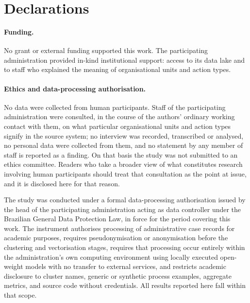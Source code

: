\section*{Declarations}

\paragraph{Funding.}
No grant or external funding supported this work. The participating administration provided
in-kind institutional support: access to its data lake and to staff who explained the meaning of
organisational units and action types.

\paragraph{Ethics and data-processing authorisation.}
No data were collected from human participants. Staff of the participating administration were
consulted, in the course of the authors' ordinary working contact with them, on what particular
organisational units and action types signify in the source system; no interview was recorded,
transcribed or analysed, no personal data were collected from them, and no statement by any
member of staff is reported as a finding. On that basis the study was not submitted to an ethics
committee. Readers who take a broader view of what constitutes research involving human
participants should treat that consultation as the point at issue, and it is disclosed here for
that reason.

The study was conducted under a formal data-processing authorisation issued by the head of the
participating administration acting as data controller under the Brazilian General Data
Protection Law, in force for the period covering this work. The instrument authorises processing of
administrative case records for academic purposes, requires pseudonymisation or anonymisation
before the clustering and vectorisation stages, requires that processing occur entirely within
the administration's own computing environment using locally executed open-weight models with
no transfer to external services, and restricts academic disclosure to cluster names, generic or
synthetic process examples, aggregate metrics, and source code without credentials. All results
reported here fall within that scope.

